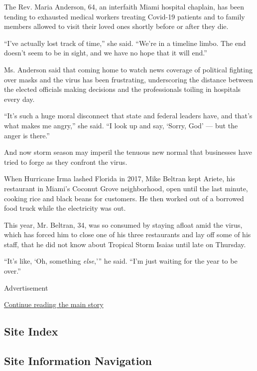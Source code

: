 The Rev. Maria Anderson, 64, an interfaith Miami hospital chaplain, has
been tending to exhausted medical workers treating Covid-19 patients and
to family members allowed to visit their loved ones shortly before or
after they die.

``I've actually lost track of time,'' she said. ``We're in a timeline
limbo. The end doesn't seem to be in sight, and we have no hope that it
will end.''

Ms. Anderson said that coming home to watch news coverage of political
fighting over masks and the virus has been frustrating, underscoring the
distance between the elected officials making decisions and the
professionals toiling in hospitals every day.

``It's such a huge moral disconnect that state and federal leaders have,
and that's what makes me angry,'' she said. ``I look up and say, `Sorry,
God' --- but the anger is there.''

And now storm season may imperil the tenuous new normal that businesses
have tried to forge as they confront the virus.

When Hurricane Irma lashed Florida in 2017, Mike Beltran kept Ariete,
his restaurant in Miami's Coconut Grove neighborhood, open until the
last minute, cooking rice and black beans for customers. He then worked
out of a borrowed food truck while the electricity was out.

This year, Mr. Beltran, 34, was so consumed by staying afloat amid the
virus, which has forced him to close one of his three restaurants and
lay off some of his staff, that he did not know about Tropical Storm
Isaias until late on Thursday.

``It's like, `Oh, something \emph{else},''' he said. ``I'm just waiting
for the year to be over.''

Advertisement

\protect\hyperlink{after-bottom}{Continue reading the main story}

\hypertarget{site-index}{%
\subsection{Site Index}\label{site-index}}

\hypertarget{site-information-navigation}{%
\subsection{Site Information
Navigation}\label{site-information-navigation}}

